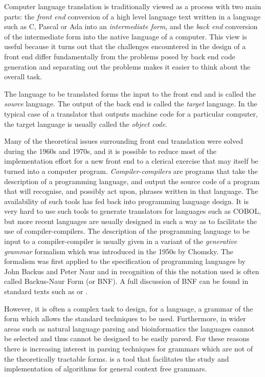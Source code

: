 Computer language translation is
traditionally viewed as a process with two main parts: the {\em front
end} conversion of a high level language text written in a language such
as C, Pascal or Ada into an {\em intermediate form}, and the {\em back end}
conversion of the intermediate form into the native language of a
computer.  This view is useful because it turns out that the
challenges encountered in the design of a front end differ fundamentally
from the problems posed by back end code generation and separating out
the problems makes it easier to think about the overall task. 


The language to be translated forms the input to the front end and is
called the {\em source} language. The output of the back end is called
the {\em target} language. In the typical case of a
translator that outputs machine code for a particular computer, the
target language is usually called the {\em object code}.


Many of the theoretical
issues surrounding front end translation were solved during the 1960s
and 1970s, and it is possible to reduce most of the implementation
effort for a new front end to a clerical exercise that may itself be
turned into a computer program. {\em Compiler-compilers} are programs
that take the description of a programming language,
and output the source code of a program that will
recognise, and possibly act upon, phrases written in that language. 
The availability of such tools has fed back into programming language
design. It is very hard to use such tools to generate translators for
languages such as COBOL, but more recent languages are usually
designed in such a way as to facilitate the use of compiler-compilers. 
The description of the programming language to be input to a
compiler-compiler is usually given in a variant of the {\em
generative grammar} formalism which was introduced in the
1950s by Chomsky. The formalism was first applied to the
specification of programming languages by John Backus and
Peter Naur and in recognition of this
the notation used is often called Backus-Naur Form (or BNF).
A full discussion of BNF can be found in standard texts
such as \cite{dragon} or \cite{AHO72}.

However, it is often a complex task to design, for a language, a
grammar of the form which allows the standard techniques to be used. 
Furthermore,
in wider areas such as natural language parsing and bioinformatics
the languages cannot be selected and thus cannot be designed to be
easily parsed. For these reasons there is increasing interest in
parsing techniques for grammars which are not of the theoretically
tractable forms. \gtb is a tool that facilitates the study and 
implementation of algorithms for general context free grammars.

